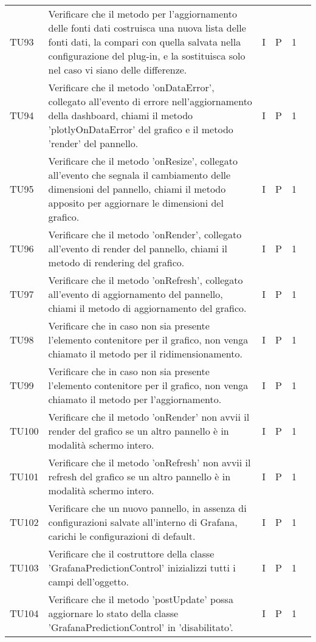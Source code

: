 \begin{longtable} {
		>{}p{12mm}
		>{}p{79.5mm}
		>{}p{9mm}
		>{}p{8mm}
		>{}p{14mm}
		>{}p{0mm}}
	TU93		& Verificare che il metodo per l'aggiornamento delle fonti dati costruisca una nuova lista delle fonti dati, la compari con quella salvata nella configurazione del plug-in, e la sostituisca solo nel caso vi siano delle differenze. & I & P & 1 &\TBstrut \\ [2mm]
	TU94		& Verificare che il metodo 'onDataError', collegato all'evento di errore nell'aggiornamento della dashboard, chiami il metodo 'plotlyOnDataError' del grafico e il metodo 'render' del pannello.& I & P & 1 &\TBstrut \\ [2mm]
	TU95		& Verificare che il metodo 'onResize', collegato all'evento che segnala il cambiamento delle dimensioni del pannello, chiami il metodo apposito per aggiornare le dimensioni del grafico.& I & P & 1 &\TBstrut \\ [2mm]
	TU96		& Verificare che il metodo 'onRender', collegato all'evento di render del pannello, chiami il metodo di rendering del grafico.& I & P & 1 &\TBstrut \\ [2mm]
	TU97		& Verificare che il metodo 'onRefresh', collegato all'evento di aggiornamento del pannello, chiami il metodo di aggiornamento del grafico.& I & P & 1 &\TBstrut \\ [2mm]
	TU98		& Verificare che in caso non sia presente l'elemento contenitore per il grafico, non venga chiamato il metodo per il ridimensionamento.& I & P & 1 &\TBstrut \\ [2mm]
	TU99		& Verificare che in caso non sia presente l'elemento contenitore per il grafico, non venga chiamato il metodo per l'aggiornamento.& I & P & 1 &\TBstrut \\ [2mm]
	TU100		& Verificare che il metodo 'onRender' non avvii il render del grafico se un altro pannello è in modalità schermo intero.& I & P & 1 &\TBstrut \\ [2mm]
	TU101		& Verificare che il metodo 'onRefresh' non avvii il refresh del grafico se un altro pannello è in modalità schermo intero.& I & P & 1 &\TBstrut \\ [2mm]
	TU102		& Verificare che un nuovo pannello, in assenza di configurazioni salvate all'interno di Grafana, carichi le configurazioni di default.& I & P & 1 &\TBstrut \\ [2mm]
	TU103		& Verificare che il costruttore della classe 'GrafanaPredictionControl' inizializzi tutti i campi dell'oggetto.& I & P & 1 &\TBstrut \\ [2mm]
	TU104		& Verificare che il metodo 'postUpdate' possa aggiornare lo stato della classe 'GrafanaPredictionControl' in 'disabilitato'.& I & P & 1 &\TBstrut \\ [2mm]

\end{longtable}
